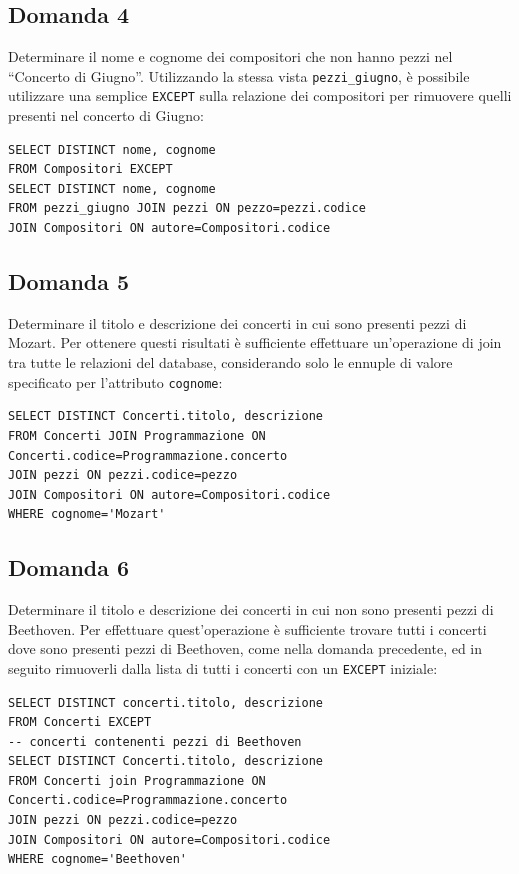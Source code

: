 \documentclass{article}
\numberwithin{equation}{subsection}
\begin{document}
\subsection{Domanda 4}
Determinare il nome e cognome dei compositori che non hanno pezzi nel ``Concerto di Giugno''. Utilizzando la stessa vista \verb|pezzi_giugno|, è possibile utilizzare una semplice \verb|EXCEPT| sulla 
relazione dei compositori per rimuovere quelli presenti nel concerto di Giugno:
\begin{verbatim}
SELECT DISTINCT nome, cognome
FROM Compositori EXCEPT
SELECT DISTINCT nome, cognome
FROM pezzi_giugno JOIN pezzi ON pezzo=pezzi.codice 
JOIN Compositori ON autore=Compositori.codice
\end{verbatim}

\subsection{Domanda 5}
Determinare il titolo e descrizione dei concerti in cui sono presenti pezzi di Mozart. Per ottenere questi risultati è sufficiente effettuare un'operazione di join tra tutte le relazioni del database, 
considerando solo le ennuple di valore specificato per l'attributo \verb|cognome|:
\begin{verbatim}
SELECT DISTINCT Concerti.titolo, descrizione 
FROM Concerti JOIN Programmazione ON Concerti.codice=Programmazione.concerto
JOIN pezzi ON pezzi.codice=pezzo
JOIN Compositori ON autore=Compositori.codice
WHERE cognome='Mozart'
\end{verbatim}

\subsection{Domanda 6}
Determinare il titolo e descrizione dei concerti in cui non sono presenti pezzi di Beethoven. Per effettuare quest'operazione è sufficiente trovare tutti i concerti dove sono presenti 
pezzi di Beethoven, come nella domanda precedente, ed in seguito rimuoverli dalla lista di tutti i concerti con un \verb|EXCEPT| iniziale:
\begin{verbatim}
SELECT DISTINCT concerti.titolo, descrizione
FROM Concerti EXCEPT
-- concerti contenenti pezzi di Beethoven
SELECT DISTINCT Concerti.titolo, descrizione 
FROM Concerti join Programmazione ON Concerti.codice=Programmazione.concerto
JOIN pezzi ON pezzi.codice=pezzo
JOIN Compositori ON autore=Compositori.codice
WHERE cognome='Beethoven'
\end{verbatim}
\end{document}
